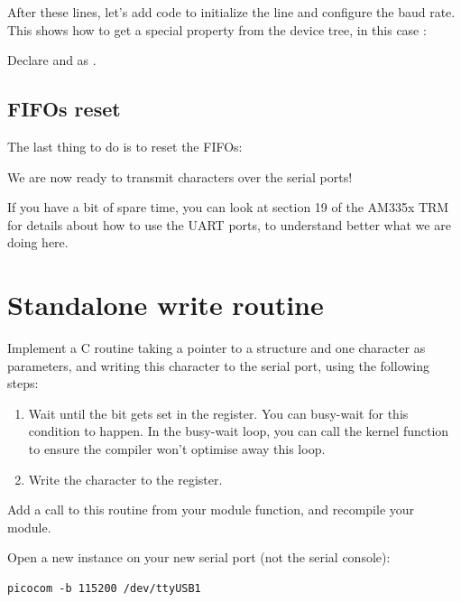 After these lines, let's add code to initialize the line
and configure the baud rate. This shows how to get a special
property from the device tree, in this case :


Declare  and  as .

\subsection{FIFOs reset}

The last thing to do is to reset the FIFOs:


We are now ready to transmit characters over the serial ports!

If you have a bit of spare time, you can look at section 19 of the
AM335x TRM for details about how to use the UART ports, to understand
better what we are doing here.

\section{Standalone write routine}

Implement a C routine taking a pointer to a 
structure and one character as parameters, and writing
this character to the serial port, using the following steps:

\begin{enumerate}
\item Wait until the  bit gets set in the
   register.  You can busy-wait for this condition to happen.
  In the busy-wait loop, you can call the  kernel function
  to ensure the compiler won't optimise away this loop.
\item Write the character to the  register.
\end{enumerate}

Add a call to this routine from your module  function,
and recompile your module.

Open a new  instance on your new serial port (not the
serial console):

\begin{verbatim}
picocom -b 115200 /dev/ttyUSB1
\end{verbatim}

